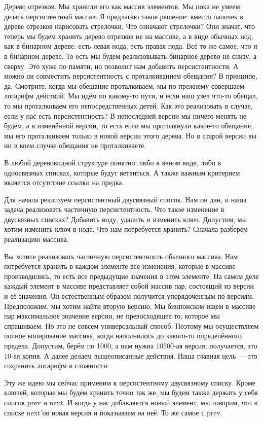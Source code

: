\documentclass[12pt]{article}
\begin{document}
Дерево отрезков. Мы хранили его как массив элементов. Мы пока не умеем делать персистентный массив. Я предлагаю такое решение: вместо палочек в дереве отрезков нарисовать стрелочки. Что означают стрелочки? Они значат, что теперь мы будем хранить дерево отрезков не на массиве, а в виде обычных нод, как в бинарном дереве: есть левая нода, есть правая нода. Всё то же самое, что и в бинарном дереве. То есть мы будем реализовывать бинарное дерево не снизу, а сверху. Это хуже по памяти, но позволит нам добавить персистентности. А можно ли совместить персистентность с проталкиванием обещания? В принципе, да. Смотрите, когда мы обещание проталкиваем, мы по-прежнему совершаем логарифм действий. Мы идём по какому-то пути, и если наш узел что-то обещал, то мы проталкиваем его непосредственных детей. Как это реализовать в случае, если у нас есть персистентность? В непоследней версии мы ничего менять не будем, а в изменённой версии, то есть если мы протолкнули какое-то обещание, мы его проталкиваем только в новой версии этого дерева. Но в старой версии вы ни в коем случае обещания не проталкиваете.

В любой деревовидной структуре понятно: либо в явном виде, либо в односвязных списках, которые будут ветвиться. А также важным критерием является отсутствие ссылки на предка.

Для начала реализуем персистентный двусвязный список. Нам он дан, и наша задача реализовать частичную персистентность. Что такое изменение в двусвязных списках? Добавить ноду, удалить и изменить ключ. Допустим, мы хотим изменить ключ в ноде. Что нам потребуется хранить? Сначала разберём реализацию массива.

Вы хотите реализовать частичную персистентность обычного массива. Нам потребуется хранить в каждом элементе все изменения, которые в массиве производились, то есть все предыдущие значения в этом элементе. На самом деле каждый элемент в массиве представляет собой массив пар, состоящий из версии и её значения. Он естественным образом получится упорядоченным по версиям. Предположим, мы хотим найти вторую версию. Мы бинпоиском ищем в массиве пар максимальное значение версии, не превосходящее то, которое мы спрашиваем. Но это не совсем универсальный способ. Поэтому мы осуществляем полное копирование массива, когда наполнилось до какого-то определённого предела. Допустим, берём по 1000, а нам нужна 10500-ая версия, получается, это 10-ая копия. А далее делаем вышеописанные действия. Наша главная цель --- это сохранить логарифм в сложности.

Эту же идею мы сейчас применим к персистентному двусвязному списку. Кроме ключей, которые мы будем хранить точно так же, мы будем также держать у себя список prev и next. И когда у нас добавляется новый элемент, мы говорим, что в списке next'ов новая версия и показываем на неё. То же самое с prev.
\end{document}
